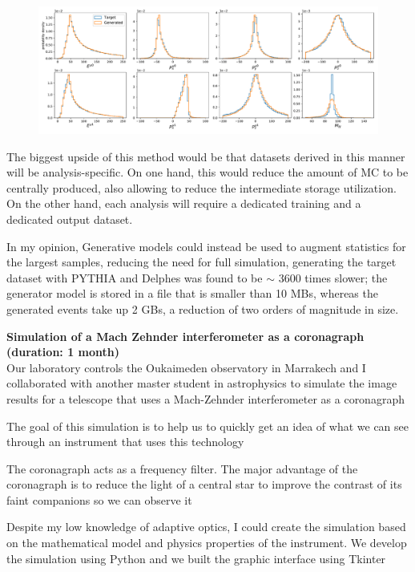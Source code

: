 \documentclass[11pt, a4paper]{awesome-cv}
\begin{document}
\begin{cvletter}
\begin{figure}[h]
	\centering
	\includegraphics[width=\textwidth]{figs/trial3_epoch39200_minigantest_final.pdf}
\end{figure}
The biggest upside of this method would be that datasets derived in this manner will be analysis-specific. On one hand, this would reduce the amount of MC to be centrally produced, also allowing to reduce the intermediate storage utilization. On the other hand, each analysis will require a dedicated training and a dedicated output dataset. 


In my opinion, Generative models could instead be used to augment statistics for the largest samples, reducing the need for full simulation, generating the target dataset with PYTHIA and Delphes was found to be $\sim$ 3600 times slower; the generator model is stored in a file that is smaller than 10 MBs, whereas the generated events take up 2 GBs, a reduction of two orders of magnitude in size. 

 
 \newpage
\textbf{Simulation of a Mach Zehnder interferometer as a coronagraph (duration: 1 month) 
}\\
Our laboratory controls the Oukaimeden observatory in Marrakech and I collaborated with another master student in astrophysics to simulate the image results for a telescope that uses a Mach-Zehnder interferometer as a coronagraph 

The goal of this simulation is to help us to quickly get an idea of what we can see through an instrument that uses this technology 

The coronagraph acts as a frequency filter. The major advantage of the coronagraph is to reduce the light of a central star to improve the contrast of its faint companions so we can observe it  

Despite my low knowledge of adaptive optics, I could create the simulation based on the mathematical model and physics properties of the instrument. We develop the simulation using Python and we built the graphic interface using Tkinter 



\end{cvletter}
\end{document}
